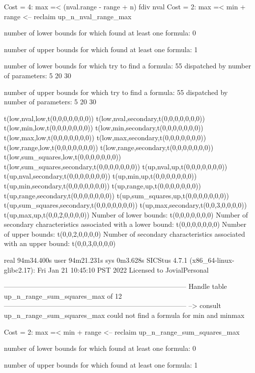 Cost =  4:  max =< (nval.range - range + n) fdiv nval
Cost =  2:  max =< min + range
<-- reclaim up_n_nval_range_max

number of lower bounds for which found at least one formula: 0

number of upper bounds for which found at least one formula: 1

number of lower bounds for which try to find a formula: 55
dispatched by number of parameters: 5  20  30

number of upper bounds for which try to find a formula: 55
dispatched by number of parameters: 5  20  30

t(low,nval,low,t(0,0,0,0,0,0,0))
t(low,nval,secondary,t(0,0,0,0,0,0,0))
t(low,min,low,t(0,0,0,0,0,0,0))
t(low,min,secondary,t(0,0,0,0,0,0,0))
t(low,max,low,t(0,0,0,0,0,0,0))
t(low,max,secondary,t(0,0,0,0,0,0,0))
t(low,range,low,t(0,0,0,0,0,0,0))
t(low,range,secondary,t(0,0,0,0,0,0,0))
t(low,sum_squares,low,t(0,0,0,0,0,0,0))
t(low,sum_squares,secondary,t(0,0,0,0,0,0,0))
t(up,nval,up,t(0,0,0,0,0,0,0))
t(up,nval,secondary,t(0,0,0,0,0,0,0))
t(up,min,up,t(0,0,0,0,0,0,0))
t(up,min,secondary,t(0,0,0,0,0,0,0))
t(up,range,up,t(0,0,0,0,0,0,0))
t(up,range,secondary,t(0,0,0,0,0,0,0))
t(up,sum_squares,up,t(0,0,0,0,0,0,0))
t(up,sum_squares,secondary,t(0,0,0,0,0,0,0))
t(up,max,secondary,t(0,0,3,0,0,0,0))
t(up,max,up,t(0,0,2,0,0,0,0))
Number of lower bounds:                                             t(0,0,0,0,0,0,0)
Number of secondary characteristics associated with a lower bound:  t(0,0,0,0,0,0,0)
Number of upper bounds:                                             t(0,0,2,0,0,0,0)
Number of secondary characteristics associated with an upper bound: t(0,0,3,0,0,0,0)

real	94m34.400s
user	94m21.231s
sys	0m3.628s
SICStus 4.7.1 (x86_64-linux-glibc2.17): Fri Jan 21 10:45:10 PST 2022
Licensed to JovialPersonal


--------------------------------------------------------------------------------
Handle table up_n_range_sum_squares_max of 12
--------------------------------------------------------------------------------
--> consult up_n_range_sum_squares_max
could not find a formula for min and minmax

Cost =  2:  max =< min + range
<-- reclaim up_n_range_sum_squares_max

number of lower bounds for which found at least one formula: 0

number of upper bounds for which found at least one formula: 1

